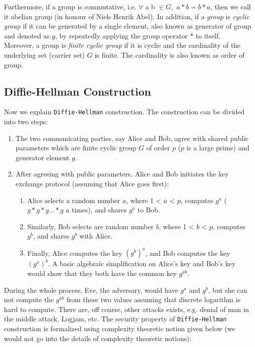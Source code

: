     \noindent
    Furthermore, if a group is commutative, i.e. 
    $\forall$ a b $\in  G,$  $a * b = b * a$, then we call it abelian group (in honour of Niels Henrik Abel). In addition, 
    if a \textit{group} is \textit{cyclic group} if it can be generated by a single element, also known as generator of group 
    and denoted as $g$, by repeatedly applying the group operator $*$ to itself. Moreover, a group is \textit{finite cyclic group}
    if it is cyclic and the cardinality of the underlying set (carrier set) $G$ is finite. The cardinality is also known as order of group. 
	    
    
     
     \subsection{Diffie-Hellman Construction}
     \label{sec:diffie-hellman}
     	Now we explain \texttt{Diffie-Hellman} construction. The construction can be divided into two steps:
		\begin{enumerate}
		\item The two communicating parties, say Alice and Bob, agree with shared public parameters which 
		are finite cyclic group $G$ of order $p$ ($p$ is a large prime) and generator element $g$.
		\item After agreeing with public parameters, Alice and Bob initiates the key exchange protocol (assuming that 
		 Alice goes first):
		 \begin{enumerate}
		   \item Alice selects a random number $a$, where 1 < $a$ < $p$, computes $g^{a}$ ( $g * g * g ... * g$  $a$ times), and shares 
		   $g^{a}$ to Bob. 
		   \item Similarly, Bob selects are random number $b$, where 1 < $b$ < $p$, computes $g^{b}$, and shares  $g^{b}$
		   with Alice.
		   \item Finally, Alice computes the key $(g^{b})^{a}$, and Bob computes the key $(g^{a})^{b}$.  A basic 
		   algebraic simplification on Alice's key and Bob's key would show that they both have the 
		   common key  $g^{ab}$.
		   
		 \end{enumerate}
      \end{enumerate}		
      
     
      \noindent
       During the whole process, Eve, the adversary, would have $g^{a}$ and $g^{b}$, but she can not compute the 
      $ g^{ab}$ from these two values assuming that discrete logarithm is hard to compute. 
      There are, off course, other attacks exists, e.g. denial of man in the middle attack, Logjam, etc. 
      The security property of \texttt{Diffie-Hellman} construction is formalized using complexity theoretic notion 
      given below (we would not go into the details of complexity theoretic notions):
      
